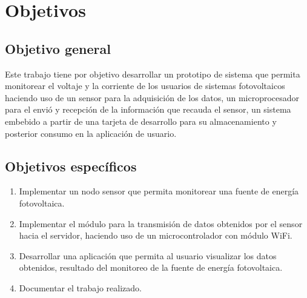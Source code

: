 
\section{Objetivos}

\subsection{Objetivo general}
Este trabajo tiene por objetivo desarrollar un prototipo de sistema que permita monitorear el voltaje y la corriente de los usuarios de sistemas fotovoltaicos haciendo uso de un sensor para la adquisición de los datos, un microprocesador para el envió y recepción de la información que recauda el sensor, un sistema embebido a partir de una tarjeta de desarrollo para su almacenamiento y posterior consumo en la aplicación de usuario.

\subsection{Objetivos específicos}
\begin{enumerate}[label=\arabic*.]
    \item Implementar un nodo sensor que permita monitorear una fuente de energía fotovoltaica.
    \item Implementar el módulo para la transmisión de datos obtenidos por el sensor hacia el servidor, haciendo uso de un microcontrolador con módulo WiFi. 
    \item Desarrollar una aplicación que permita al usuario visualizar los datos obtenidos, resultado del monitoreo de la fuente de energía fotovoltaica.
    \item Documentar el trabajo realizado.
\end{enumerate}
